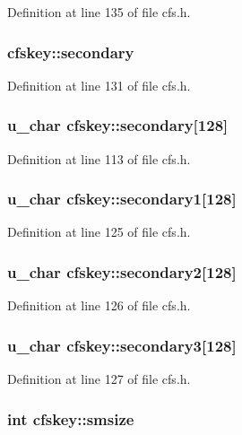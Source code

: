 Definition at line 135 of file cfs.h.
\subsubsection{ {\bf cfskey::secondary}}\label{structcfskey_o13}




Definition at line 131 of file cfs.h.
\subsubsection{\setlength{\rightskip}{0pt plus 5cm}u\_\-char {\bf cfskey::secondary}[128]}\label{structcfskey_o2}




Definition at line 113 of file cfs.h.
\subsubsection{\setlength{\rightskip}{0pt plus 5cm}u\_\-char {\bf cfskey::secondary1}[128]}\label{structcfskey_o6}




Definition at line 125 of file cfs.h.
\subsubsection{\setlength{\rightskip}{0pt plus 5cm}u\_\-char {\bf cfskey::secondary2}[128]}\label{structcfskey_o7}




Definition at line 126 of file cfs.h.
\subsubsection{\setlength{\rightskip}{0pt plus 5cm}u\_\-char {\bf cfskey::secondary3}[128]}\label{structcfskey_o10}




Definition at line 127 of file cfs.h.
\subsubsection{\setlength{\rightskip}{0pt plus 5cm}int {\bf cfskey::smsize}}\label{structcfskey_o22}




